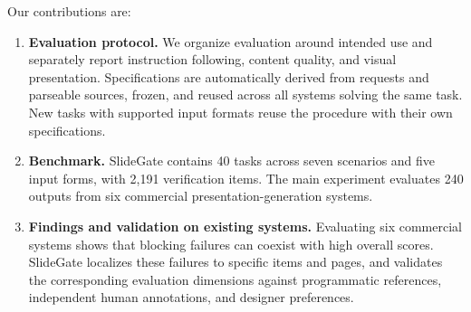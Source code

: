 Our contributions are:
\begin{enumerate}
\item \textbf{Evaluation protocol.} We organize evaluation around intended use and separately report instruction following, content quality, and visual presentation. Specifications are automatically derived from requests and parseable sources, frozen, and reused across all systems solving the same task. New tasks with supported input formats reuse the procedure with their own specifications.
\item \textbf{Benchmark.} SlideGate contains 40 tasks across seven scenarios and five input forms, with 2,191 verification items. The main experiment evaluates 240 outputs from six commercial presentation-generation systems.
\item \textbf{Findings and validation on existing systems.} Evaluating six commercial systems shows that blocking failures can coexist with high overall scores. SlideGate localizes these failures to specific items and pages, and validates the corresponding evaluation dimensions against programmatic references, independent human annotations, and designer preferences.
\end{enumerate}
